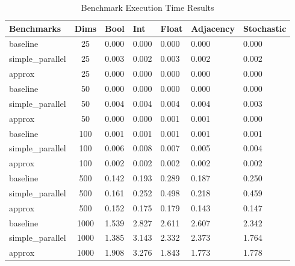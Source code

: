 \documentclass[oneside]{article}
\begin{document}
\begin{table}[ht!]
\centering
\caption{Benchmark Execution Time Results}
{\renewcommand{\arraystretch}{1.15}}
\begin{tabular}{|l|c|l|l|l|l|l|} \hline
\textbf{Benchmarks}&        \textbf{Dims}&       \textbf{Bool}&        \textbf{Int}&       \textbf{Float}&    \textbf{Adjacency}&    \textbf{Stochastic}\\ \hline
baseline&             25&      0.000&       0.000&     0.000&    0.000&     0.000\\ \hline
simple\_parallel&     25&      0.003&       0.002&     0.003&    0.002&     0.002\\ \hline
approx&               25&      0.000&       0.000&     0.000&    0.000&     0.000\\ \hline
baseline&             50&      0.000&       0.000&     0.000&    0.000&     0.000\\ \hline
simple\_parallel&     50&      0.004&       0.004&     0.004&    0.004&     0.003\\ \hline
approx&               50&      0.000&       0.000&     0.001&    0.001&     0.000\\ \hline
baseline&            100&      0.001&       0.001&     0.001&    0.001&     0.001\\ \hline
simple\_parallel&    100&      0.006&       0.008&     0.007&    0.005&     0.004\\ \hline
approx&              100&      0.002&       0.002&     0.002&    0.002&     0.002\\ \hline
baseline&            500&      0.142&       0.193&     0.289&    0.187&     0.250\\ \hline
simple\_parallel&    500&      0.161&       0.252&     0.498&    0.218&     0.459\\ \hline
approx&              500&      0.152&       0.175&     0.179&    0.143&     0.147\\ \hline
baseline&           1000&      1.539&       2.827&     2.611&    2.607&     2.342\\ \hline
simple\_parallel&   1000&      1.385&       3.143&     2.332&    2.373&     1.764\\ \hline
approx&             1000&      1.908&       3.276&     1.843&    1.773&     1.778\\ \hline
\end{tabular}
\label{table:benchmark}
\end{table}
\end{document}
